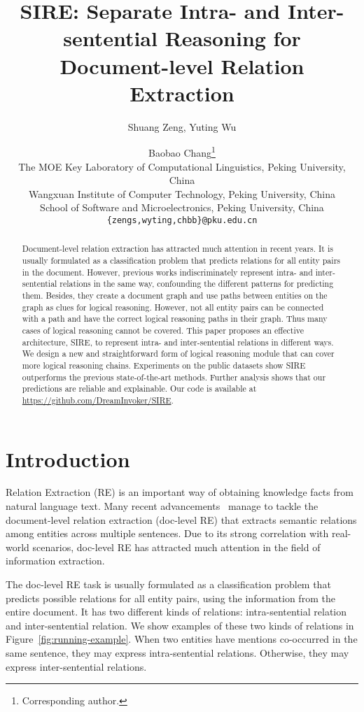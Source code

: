 \documentclass[11pt,a4paper]{article}
\title{SIRE: Separate Intra- and Inter-sentential Reasoning for\\Document-level Relation Extraction}
\author{
  Shuang Zeng,
  Yuting Wu\and
  Baobao Chang\thanks{\;\;Corresponding author.} \\
  The MOE Key Laboratory of Computational Linguistics, Peking University, China \\
  Wangxuan Institute of Computer Technology, Peking University, China\\
  School of Software and Microelectronics, Peking University, China\\
  \texttt{
    \{zengs,wyting,chbb\}@pku.edu.cn
  }
}
\date{}
\begin{document}
\maketitle



\begin{abstract}
Document-level relation extraction has attracted much attention in recent years. It is usually formulated as a classification problem that predicts relations for all entity pairs in the document. However, previous works indiscriminately represent intra- and inter-sentential relations in the same way, confounding the different patterns for predicting them. Besides, they create a document graph and use paths between entities on the graph as clues for logical reasoning. However, not all entity pairs can be connected with a path and have the correct logical reasoning paths in their graph. Thus many cases of logical reasoning cannot be covered. This paper proposes an effective architecture, SIRE, to represent intra- and inter-sentential relations in different ways. We design a new and straightforward form of logical reasoning module that can cover more logical reasoning chains. Experiments on the public datasets show SIRE outperforms the previous state-of-the-art methods. 
Further analysis shows that our predictions are reliable and explainable. Our code is available at \url{https://github.com/DreamInvoker/SIRE}.

\end{abstract}
 \section{Introduction\label{sec:introduction}}

Relation Extraction (RE) is an important way of obtaining knowledge facts from natural language text. Many recent advancements~\citep{inter, EoG, DocRED-paper, LSR, GAIN, GLRE} manage to tackle the document-level relation extraction (doc-level RE) that extracts semantic relations among entities across multiple sentences. Due to its strong correlation with real-world scenarios, doc-level RE has attracted much attention in the field of information extraction. 

The doc-level RE task is usually formulated as a classification problem that predicts possible relations for all entity pairs, using the information from the entire document.
It has two different kinds of relations: intra-sentential relation and inter-sentential relation. We show examples of these two kinds of relations in Figure~\ref{fig:running-example}. When two entities have mentions co-occurred in the same sentence, they may express intra-sentential relations. Otherwise, they may express inter-sentential relations. 
\end{document}
